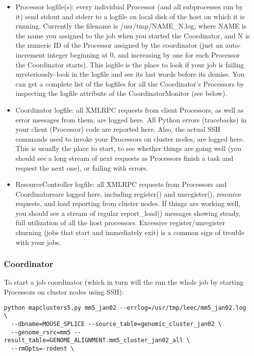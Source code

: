 \documentclass{howto}
\begin{document}
\begin{itemize}

\item
Processor logfile(s): every individual Processor (and all subprocesses run by it) send stdout and stderr to a logfile on local disk of the host on which it is running.  Currently the filename is /usr/tmp/NAME_N.log, where NAME is the name you assigned to the job when you started the Coordinator, and N is the numeric ID of the Processor assigned by the coordinator (just an auto-increment integer beginning at 0, and increasing by one for each Processor the Coordinator starts).  This logfile is the place to look if your job is failing mysteriously--look in the logfile and see its last words before its demise.  You can get a complete list of the logfiles for all the Coordinator's Processors by inspecting the logfile attribute of the CoordinatorMonitor (see below).

\item
Coordinator logfile: all XMLRPC requests from client Processors, as well as error messages from them, are logged here.  All Python errors (tracebacks) in your client (Processor) code are reported here.  Also, the actual SSH commands used to invoke your Processors on cluster nodes, are logged here.  This is usually the place to start, to see whether things are going well (you should see a long stream of next requests as Processors finish a task and request the next one), or failing with errors.

\item
ResourceController logfile: all XMLRPC requests from Processors and Coordinatorsare logged here, including register() and unregister(), resource requests, and load reporting from cluster nodes.  If things are working well, you should see a stream of regular report_load() messages showing steady, full utilization of all the host processors.  Excessive register/unregister churning (jobs that start and immediately exit) is a common sign of trouble with your jobs.

\end{itemize}
\subsubsection{Coordinator}

To start a job coordinator (which in turn will the run the whole job by starting Processors on cluster nodes using SSH):

\begin{verbatim}
python mapclusters5.py mm5_jan02 --errlog=/usr/tmp/leec/mm5_jan02.log \ 
  --dbname=MOUSE_SPLICE --source_table=genomic_cluster_jan02 \
  --genome_rsrc=mm5 --result_table=GENOME_ALIGNMENT.mm5_cluster_jan02_all \ 
  --rmOpts=-rodent \
\end{verbatim}
\end{document}
